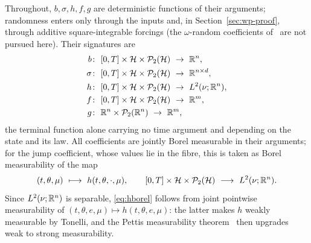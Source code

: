 Throughout, $b,\sigma,h,f,g$ are deterministic functions of their arguments; randomness
enters only through the inputs and, in Section~\ref{sec:wp-proof}, through additive
square-integrable forcings (the $\omega$-random coefficients of~\cite{ChenNie,LiMin} are
not pursued here). Their signatures are
\[
\begin{aligned}
b&\colon\ [0,T]\times\mathcal H\times\mathcal P_2(\mathcal H)\ \to\ \R^n,\\
\sigma&\colon\ [0,T]\times\mathcal H\times\mathcal P_2(\mathcal H)\ \to\ \R^{n\times d},\\
h&\colon\ [0,T]\times\mathcal H\times\mathcal P_2(\mathcal H)\ \to\ L^2(\nu;\R^n),\\
f&\colon\ [0,T]\times\mathcal H\times\mathcal P_2(\mathcal H)\ \to\ \R^m,\\
g&\colon\ \R^n\times\mathcal P_2(\R^n)\ \to\ \R^m,
\end{aligned}
\]
the terminal function alone carrying no time argument and depending on the state and its
law. All coefficients are jointly Borel measurable in their arguments; for the jump
coefficient, whose values lie in the fibre, this is taken as Borel measurability of the map
\begin{equation}\label{eq:hborel}
(t,\theta,\mu)\ \longmapsto\ h(t,\theta,\cdot,\mu),
\qquad
[0,T]\times\mathcal H\times\mathcal P_2(\mathcal H)\ \longrightarrow\ L^2(\nu;\R^n).
\end{equation}
Since $L^2(\nu;\mathbb{R}^n)$ is separable, \eqref{eq:hborel} follows from joint pointwise
measurability of $(t,\theta,e,\mu)\mapsto h(t,\theta,e,\mu)$: the latter makes $h$ weakly
measurable by Tonelli, and the Pettis measurability
theorem~\cite[Theorem~1.1.6]{HNVW} then upgrades weak to strong measurability.

